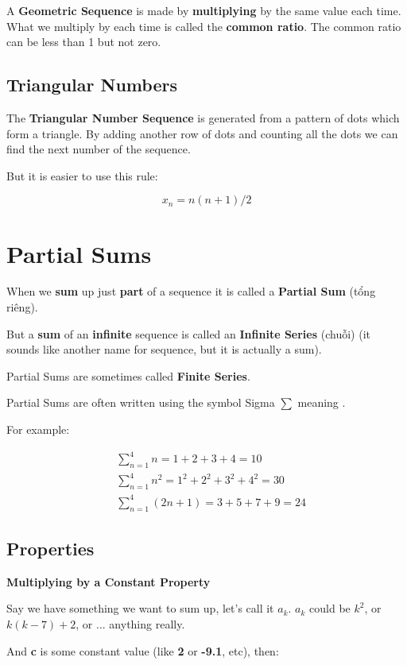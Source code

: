 A \textbf{Geometric Sequence} is made by \textbf{multiplying} by the same value each time. What we multiply by each time is called the \textbf{common ratio}. The common ratio can be less than 1 but not zero.

\subsection{Triangular Numbers}

The \textbf{Triangular Number Sequence} is generated from a pattern of dots which form a triangle. By adding another row of dots and counting all the dots we can find the next number of the sequence.

But it is easier to use this rule:

\[x_{n}=n(n+1)/2\]

\section{Partial Sums}

When we \textbf{sum} up just \textbf{part} of a sequence it is called a \textbf{Partial Sum} (tổng riêng).

But a \textbf{sum} of an \textbf{infinite} sequence is called an \textbf{Infinite Series} (chuỗi) (it sounds like another name for sequence, but it is actually a sum).

Partial Sums are sometimes called \textbf{Finite Series}.

Partial Sums are often written using the symbol Sigma $\sum$ meaning .

For example:

\begin{align*}
  &\sum\limits_{n=1}^4 n=1+2+3+4=10\\
  &\sum\limits_{n=1}^4 n^{2}=1^{2}+2^{2}+3^{2}+4^{2}=30\\
  &\sum\limits_{n=1}^4 (2n+1)=3+5+7+9=24
\end{align*}

\subsection{Properties}

\textbf{Multiplying by a Constant Property}

Say we have something we want to sum up, let's call it $a_{k}$. $a_{k}$ could be $k^{2}$, or $k(k-7)+2$, or ... anything really.

And \textbf{c} is some constant value (like \textbf{2} or \textbf{-9.1}, etc), then:


